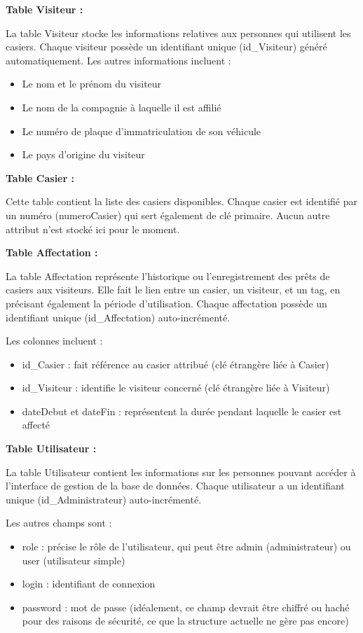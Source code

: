 \documentclass[main.tex]{subfiles}
\begin{document}
\textbf{Table Visiteur :}

La table Visiteur stocke les informations relatives aux personnes qui utilisent les casiers. Chaque visiteur possède un identifiant unique (id\_Visiteur) généré automatiquement. Les autres informations incluent : 

\begin{itemize}
\item Le nom et le prénom du visiteur
\item Le nom de la compagnie à laquelle il est affilié  
\item Le numéro de plaque d’immatriculation de son véhicule
\item Le pays d’origine du visiteur\\
\end{itemize}

\textbf{Table Casier :}

Cette table contient la liste des casiers disponibles. Chaque casier est identifié par un numéro (numeroCasier) qui sert également de clé primaire. Aucun autre attribut n’est stocké ici pour le moment. 

\textbf{Table Affectation :}

La table Affectation représente l'historique ou l'enregistrement des prêts de casiers aux visiteurs. Elle fait le lien entre un casier, un visiteur, et un tag, en précisant également la période d'utilisation. Chaque affectation possède un identifiant unique (id\_Affectation) auto-incrémenté. 

Les colonnes incluent : 
\begin{itemize}
\item id\_Casier : fait référence au casier attribué (clé étrangère liée à Casier) 
\item id\_Visiteur : identifie le visiteur concerné (clé étrangère liée à Visiteur)  
\item dateDebut et dateFin : représentent la durée pendant laquelle le casier est affecté \\
\end{itemize}

\textbf{Table Utilisateur :}

La table Utilisateur contient les informations sur les personnes pouvant accéder à l’interface de gestion de la base de données. Chaque utilisateur a un identifiant unique (id\_Administrateur) auto-incrémenté. 

Les autres champs sont : 
\begin{itemize}
\item role : précise le rôle de l’utilisateur, qui peut être admin (administrateur) ou user (utilisateur simple)
\item login : identifiant de connexion 
\item password : mot de passe (idéalement, ce champ devrait être chiffré ou haché pour des raisons de sécurité, ce que la structure actuelle ne gère pas encore) \\
\end{itemize}
 
\end{document}
